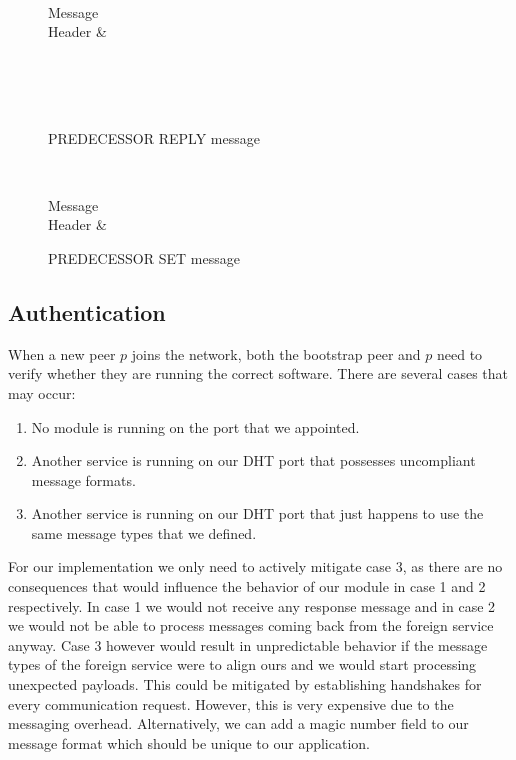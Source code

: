 \documentclass[a4paper, 11pt]{article}
\begin{document}
\begin{figure}[H]
	\centering
	\begin{bytefield}[bitwidth=0.8em]{32}
		 \\
		\begin{rightwordgroup}{Message \\  Header}
			 & 
		\end{rightwordgroup} \\
		 \\
		\skippedwords \\
	\end{bytefield}
	\caption{PREDECESSOR REPLY message}
	\label{PREDECESSORREPLY}
\end{figure}

\begin{figure}[H]
	\centering
	\begin{bytefield}[bitwidth=0.8em]{32}
		 \\
		\begin{rightwordgroup}{Message \\  Header}
			 & 
		\end{rightwordgroup}
	\end{bytefield}
	\caption{PREDECESSOR SET message}
	\label{PREDECESSORSET}
\end{figure}

\subsection*{Authentication}

When a new peer $p$ joins the network, both the bootstrap peer and $p$ need to verify whether they are running the correct software. There are several cases that may occur:

\begin{enumerate}
	\item No module is running on the port that we appointed.
	\item Another service is running on our DHT port that possesses uncompliant message formats. 
	\item Another service is running on our DHT port that just happens to use the same message types that we defined.
\end{enumerate}

For our implementation we only need to actively mitigate case 3, as there are no consequences that would influence the behavior of our module in case 1 and 2 respectively. In case 1 we would not receive any response message and in case 2 we would not be able to process messages coming back from the foreign service anyway. Case 3 however would result in unpredictable behavior if the message types of the foreign service were to align ours and we would start processing unexpected payloads. This could be mitigated by establishing handshakes for every communication request. However, this is very expensive due to the messaging overhead. Alternatively, we can add a magic number field to our message format which should be unique to our application.
\end{document}
